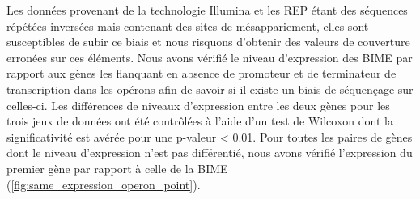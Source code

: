 \documentclass[12pt,a4paper]{report}
\begin{document}
\begin{onehalfspace}
Les données provenant de la technologie Illumina et les REP étant des séquences répétées inversées mais contenant des sites de mésappariement, elles sont susceptibles de subir ce biais et nous risquons d'obtenir des valeurs de couverture erronées sur ces éléments. Nous avons vérifié le niveau d'expression des BIME par rapport aux gènes les flanquant en absence de promoteur et de terminateur de transcription dans les opérons afin de savoir si il existe un biais de séquençage sur celles-ci. Les  différences de niveaux d'expression entre les deux gènes pour les trois jeux de données ont été contrôlées à l'aide d'un test de Wilcoxon dont la significativité est avérée pour une p-valeur < 0.01. Pour toutes les paires de gènes dont le niveau d'expression n'est pas différentié, nous avons vérifié l'expression du premier gène par rapport à celle de la BIME (\autoref{fig:same_expression_operon_point}).

\begin{figure}
\end{figure}


\end{onehalfspace}
\end{document}
